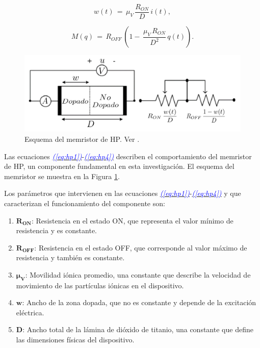 \documentclass[12pt,a4paper]{report} %
\newcommand{\eref}[1]{\hyperref[#1]{\textcolor{blue}{\textit{(\ref*{#1})}}}}
\begin{document}
	\begin{equation}
		w(t)\,=\,\mu_V\,\frac{R_{ON}}{D}\,i(t),
		\label{eq:hp3}
	\end{equation}\smallskip
	
	\begin{equation}
		M(q)\,=\,R_{OFF}\,\left(1-\,\frac{\mu_V\,R_{ON}}{D^2}\,q(t)\right).
		\label{eq:hp4}
	\end{equation}\smallskip
	
	\vspace{1cm}\begin{figure}[h]
		\centering
		\includegraphics[width=1\textwidth]{schmem.jpg}
		\caption{Esquema del memristor de HP. Ver \cite{2021}.}
		\label{fig:2021}
	\end{figure}\smallskip

	\vspace{0.5cm}\noindent Las ecuaciones \eref{eq:hp1}-\eref{eq:hp4} describen el comportamiento del memristor de HP, un componente fundamental en esta investigación. El esquema del memristor se muestra en la Figura \ref{fig:2021}.
	
	\newpage
	
	\noindent Los parámetros que intervienen en las ecuaciones \eref{eq:hp1}-\eref{eq:hp4} y que caracterizan el funcionamiento del componente son:
	
	\begin{enumerate}
		\item $\bm{R_{ON}}$: Resistencia en el estado ON, que representa el valor mínimo de resistencia y es constante.
		\item $\bm{R_{OFF}}$: Resistencia en el estado OFF, que corresponde al valor máximo de resistencia y también es constante.
		\item $\bm{\mu_V}$: Movilidad iónica promedio, una constante que describe la velocidad de movimiento de las partículas iónicas en el dispositivo.
		\item $\bm{w}$: Ancho de la zona dopada, que no es constante y depende de la excitación eléctrica.
		\item $\bm{D}$: Ancho total de la lámina de dióxido de titanio, una constante que define las dimensiones físicas del dispositivo.
	\end{enumerate}
	
\end{document}
